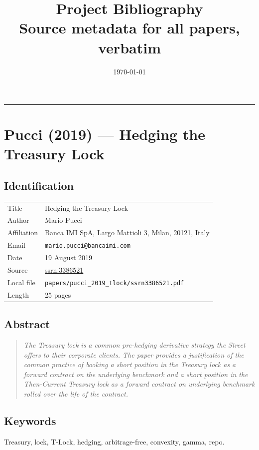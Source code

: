 \documentclass[11pt,a4paper]{article}
\title{Project Bibliography\\
       \large Source metadata for all papers, verbatim}
\author{}
\date{\today}
\begin{document}
\maketitle

\tableofcontents
\bigskip\hrule\bigskip

\section{Pucci (2019) --- Hedging the Treasury Lock}
\label{bib:pucci-2019-tlock}

\subsection*{Identification}
\begin{tabular}{@{}p{3.5cm}p{11cm}@{}}
\toprule
Title           & Hedging the Treasury Lock \\
Author          & Mario Pucci \\
Affiliation     & Banca IMI SpA, Largo Mattioli 3, Milan, 20121, Italy \\
Email           & \texttt{mario.pucci@bancaimi.com} \\
Date            & 19 August 2019 \\
Source          & \href{https://ssrn.com/abstract=3386521}{ssrn:3386521} \\
Local file      & \texttt{papers/pucci\_2019\_tlock/ssrn3386521.pdf} \\
Length          & 25 pages \\
\bottomrule
\end{tabular}

\subsection*{Abstract}
\begin{quote}\itshape
The Treasury lock is a common pre-hedging derivative strategy the
Street offers to their corporate clients. The paper provides a
justification of the common practice of booking a short position in
the Treasury lock as a forward contract on the underlying benchmark
and a short position in the Then-Current Treasury lock as a forward
contract on underlying benchmark rolled over the life of the contract.
\end{quote}

\subsection*{Keywords}
Treasury, lock, T-Lock, hedging, arbitrage-free, convexity, gamma, repo.
\end{document}
